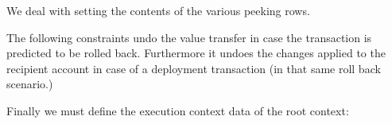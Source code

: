 \begin{center}
\end{center}
We deal with setting the contents of the various peeking rows.
\begin{description}
		
		
		
		
		
		
\end{description}
The following constraints undo the value transfer in case the transaction is predicted to be rolled back.
Furthermore it undoes the changes applied to the recipient account in case of a deployment transaction (in that same roll back scenario.)
\begin{description}
		
		
\end{description}
Finally we must define the execution context data of the root context:
\begin{description}
		
		
\end{description}
